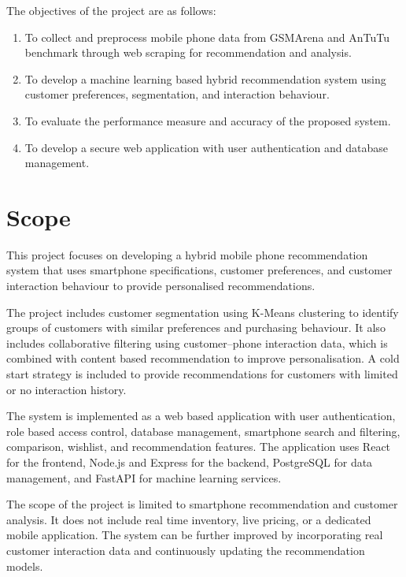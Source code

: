 \documentclass[12pt]{report}
\numberwithin{figure}{chapter}
\numberwithin{table}{chapter}
\numberwithin{equation}{chapter}
\begin{document}
The objectives of the project are as follows:

\begin{enumerate}[label=\Roman*.]
    \item To collect and preprocess mobile phone data from GSMArena and AnTuTu benchmark through web scraping for recommendation and analysis.
    
    \item To develop a machine learning based hybrid recommendation system using customer preferences, segmentation, and interaction behaviour.
    
    \item To evaluate the performance measure and accuracy of the proposed system.
    
    \item To develop a secure web application with user authentication and database management.

\end{enumerate}

\section{Scope}

This project focuses on developing a hybrid mobile phone recommendation system that uses smartphone specifications, customer preferences, and customer interaction behaviour to provide personalised recommendations. 

The project includes customer segmentation using K-Means clustering to identify groups of customers with similar preferences and purchasing behaviour. It also includes collaborative filtering using customer--phone interaction data, which is combined with content based recommendation to improve personalisation. A cold start strategy is included to provide recommendations for customers with limited or no interaction history.

The system is implemented as a web based application with user authentication, role based access control, database management, smartphone search and filtering, comparison, wishlist, and recommendation features. The application uses React for the frontend, Node.js and Express for the backend, PostgreSQL for data management, and FastAPI for machine learning services.

The scope of the project is limited to smartphone recommendation and customer analysis. It does not include real time inventory, live pricing, or a dedicated mobile application. The system can be further improved by incorporating real customer interaction data and continuously updating the recommendation models.
\end{document}
